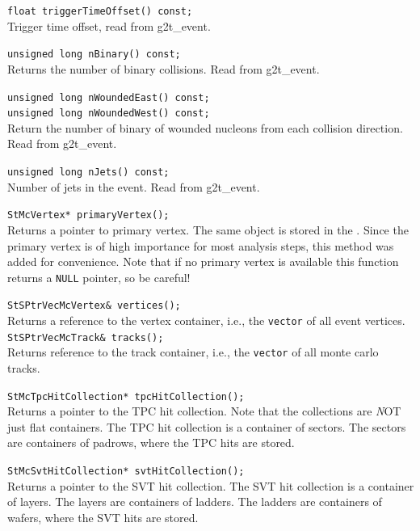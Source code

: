\begin{Entry}
    \verb+float triggerTimeOffset() const;+\\
    Trigger time offset, read from g2t\_event.

    \verb+unsigned long nBinary() const;+\\
    Returns the number of binary collisions.  Read from g2t\_event.

    \verb+unsigned long nWoundedEast() const;+\\
    \verb+unsigned long nWoundedWest() const;+\\
    Return the number of binary of wounded nucleons from each collision
    direction.  Read from g2t\_event.

    \verb+unsigned long nJets() const;+\\
    Number of jets in the event.  Read from g2t\_event.



    \verb+StMcVertex* primaryVertex();+\\
    Returns a pointer to primary vertex. The same object is stored
    in the . Since the primary vertex is of
    high importance for most analysis steps, this method was added
    for convenience. Note that if no primary vertex is available
    this function returns a {\tt NULL} pointer, so be careful!

    \verb+StSPtrVecMcVertex& vertices();+\\
    Returns a reference to the vertex container, i.e., the {\tt vector} of all
    event vertices.
    \verb+StSPtrVecMcTrack& tracks();+\\
    Returns reference to the track container, i.e., the {\tt vector} of all
    monte carlo tracks.

    \verb+StMcTpcHitCollection* tpcHitCollection();+\\ 
    Returns a pointer to the TPC hit collection.  Note that the
    collections are {\emph NOT} just flat containers.  The TPC hit
    collection is a container of sectors.  The sectors are containers
    of padrows, where the TPC hits are stored.

    \verb+StMcSvtHitCollection* svtHitCollection();+\\
    Returns a pointer to the SVT hit collection.  The SVT hit
    collection is a container of layers.  The layers are containers
    of ladders.  The ladders are containers of wafers,
    where the SVT hits are stored.



\end{Entry}
